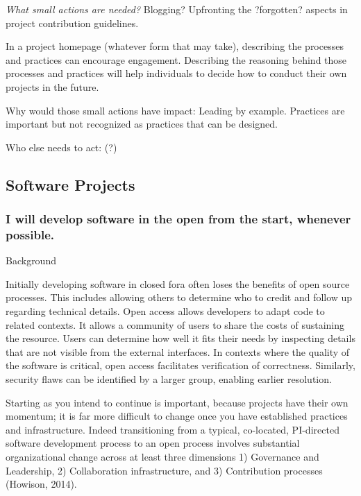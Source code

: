 \documentclass[a4paper,UKenglish]{dagman}
\renewcommand{\paragraph}[1]{\subsubsection*{#1}\xspace}
\begin{document}
\emph{What small actions are needed?} Blogging? Upfronting the ?forgotten? aspects in project contribution guidelines.

In a project homepage (whatever form that may take), describing the processes and practices can encourage engagement.  Describing the reasoning behind those processes and practices will help individuals to decide how to conduct their own projects in the future.  

Why would those small actions have impact: Leading by example. Practices are important but not recognized as practices that can be designed.

Who else needs to act: (?)


\subsection{Software Projects}


\paragraph{I will develop software in the open from the start, whenever possible.}

Background

Initially developing software in closed fora often loses the benefits of open source processes. This includes allowing others to determine who to credit and follow up regarding technical details. Open access allows developers to adapt code to related contexts. It allows a community of users to share the costs of sustaining the resource. Users can determine how well it fits their needs by inspecting details that are not visible from the external interfaces. In contexts where the quality of the software is critical, open access facilitates verification of correctness. Similarly, security flaws can be identified by a larger group, enabling earlier resolution.
 
Starting as you intend to continue is important, because projects have their own momentum; it is far more difficult to change once you have established practices and infrastructure. Indeed transitioning from a typical, co-located, PI-directed software development process to an open process involves substantial organizational change across at least three dimensions 1) Governance and Leadership, 2) Collaboration infrastructure, and 3) Contribution processes (Howison, 2014).
\end{document}
